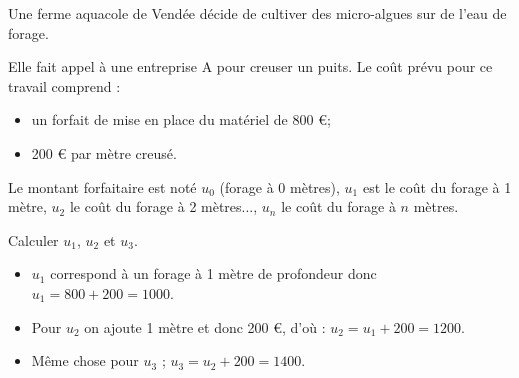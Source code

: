 \documentclass[a4paper,11pt]{exam}
\begin{document}
Une ferme aquacole de Vendée décide de cultiver des micro-algues sur de l'eau de forage.

Elle fait appel à une entreprise A pour creuser un puits. Le coût prévu pour ce travail comprend :
\begin{itemize}
	\item un forfait de mise en place du matériel de 800 €;
	\item 200 € par mètre creusé.	
\end{itemize}

Le montant forfaitaire est noté $u_0$ (forage à 0 mètres), $u_1$ est le coût du forage à 1 mètre, $u_2$ le coût du forage à 2 mètres..., $u_n$ le coût du forage à $n$ mètres.
\begin{questions}
	\question Calculer $u_1$, $u_2$ et $u_3$.

	\begin{solution}
		\begin{itemize}
			\item $u_1$ correspond à un forage à 1 mètre de profondeur donc $u_1 = 800 + 200 = 1000$.
			\item Pour $u_2$ on ajoute 1 mètre et donc 200 €, d'où : $u_2 = u_1 + 200 = 1200$.
			
			\item Même chose pour $u_3$ ; $u_3 = u_2 + 200 = 1400$.
		\end{itemize}
	\end{solution}
	\question
\end{questions}
\end{document}
